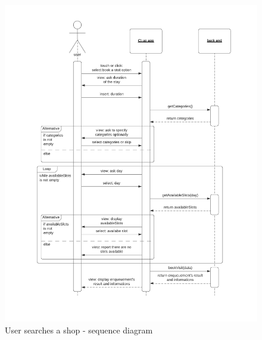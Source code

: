 \begin{figure}[h!]
    \centering
    \includegraphics[width=\textwidth]{Images/sequencediagrams/UserbooksavisitSD.png}
    \caption{\label{fig:userbookavisit}User searches a shop - sequence diagram}
\end{figure}


